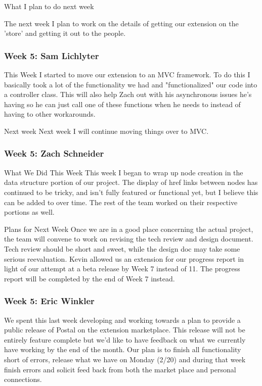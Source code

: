 What I plan to do next week

The next week I plan to work on the details of getting our extension on the 'store' and getting it out to the people. 

\subsubsection{Week 5: Sam Lichlyter}

This Week
I started to move our extension to an MVC framework. To do this I basically took a lot of the functionality we had and "functionalized" our code into a controller class. This will also help Zach out with his asynchronous issues he's having so he can just call one of these functions when he needs to instead of having to other workarounds.

Next week
Next week I will continue moving things over to MVC. 

\subsubsection{Week 5: Zach Schneider}

What We Did This Week
This week I began to wrap up node creation in the data structure portion of our project. The display of href links between nodes has continued to be tricky, and isn't fully featured or functional yet, but I believe this can be added to over time. The rest of the team worked on their respective portions as well.

Plans for Next Week
Once we are in a good place concerning the actual project, the team will convene to work on revising the tech review and design document. Tech review should be short and sweet, while the design doc may take some serious reevaluation. Kevin allowed us an extension for our progress report in light of our attempt at a beta release by Week 7 instead of 11. The progress report will be completed by the end of Week 7 instead.

\subsubsection{Week 5: Eric Winkler}

We spent this last week developing and working towards a plan to provide a public release of Postal on the extension marketplace. This release will not be entirely feature complete but we'd like to have feedback on what we currently have working by the end of the month. Our plan is to finish all functionality short of errors, release what we have on Monday (2/20) and during that week finish errors and solicit feed back from both the market place and personal connections. 

